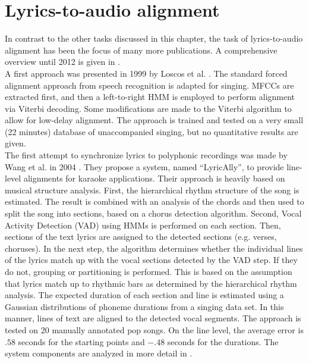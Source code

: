\section{Lyrics-to-audio alignment}
In contrast to the other tasks discussed in this chapter, the task of lyrics-to-audio alignment has been the focus of many more publications. A comprehensive overview until 2012 is given in \cite{goto_alignment}.\\
A first approach was presented in 1999 by Loscos et al. \cite{loscos}. The standard forced alignment approach from speech recognition is adapted for singing. MFCCs are extracted first, and then a left-to-right HMM is employed to perform alignment via Viterbi decoding. Some modifications are made to the Viterbi algorithm to allow for low-delay alignment. The approach is trained and tested on a very small (22 minutes) database of unaccompanied singing, but no quantitative results are given.\\
The first attempt to synchronize lyrics to polyphonic recordings was made by Wang et al. in 2004 \cite{Wang2004}. They propose a system, named ``LyricAlly'', to provide line-level alignments for karaoke applications. Their approach is heavily based on musical structure analysis. First, the hierarchical rhythm structure of the song is estimated. The result is combined with an analysis of the chords and then used to split the song into sections, based on a chorus detection algorithm. Second, Vocal Activity Detection (VAD) using HMMs is performed on each section. Then, sections of the text lyrics are assigned to the detected sections (e.g. verses, choruses). In the next step, the algorithm determines whether the individual lines of the lyrics match up with the vocal sections detected by the VAD step. If they do not, grouping or partitioning is performed. This is based on the assumption that lyrics match up to rhythmic bars as determined by the hierarchical rhythm analysis. The expected duration of each section and line is estimated using a Gaussian distributions of phoneme durations from a singing data set. In this manner, lines of text are aligned to the detected vocal segments. The approach is tested on 20 manually annotated pop songs. On the line level, the average error is $.58$ seconds for the starting points and $-.48$ seconds for the durations. The system components are analyzed in more detail in \cite{lyrically}.\\
